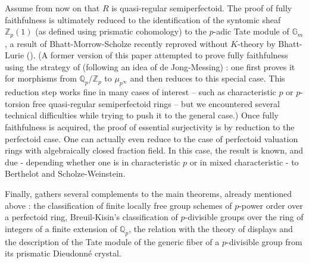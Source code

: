 \documentclass{amsart}
\theoremstyle{plain}
\theoremstyle{definition}
\newcommand{\F}{\mathbb{F}}
\newcommand{\Q}{\mathbb{Q}}
\newcommand{\Z}{\mathbb{Z}}
\newcommand{\purple}[1]{{\color{black} #1}}
\begin{document}
Assume from now on that $R$ is quasi-regular semiperfectoid. The proof of fully faithfulness is ultimately reduced to the identification of the syntomic sheaf $\Z_p(1)$ (as defined using prismatic cohomology) to the $p$-adic Tate module of $\mathbb{G}_m$, a result of Bhatt-Morrow-Scholze recently reproved without $K$-theory by Bhatt-Lurie (\cite[Theorem 7.5.6]{bhatt2022absolute}). (A former version of this paper attempted to prove fully faithfulness using the strategy of \cite{scholze_weinstein_moduli_of_p_divisible_groups} (following an idea of de Jong-Messing) : one first proves it for morphisms from $\mathbb{Q}_p/\mathbb{Z}_p$ to $\mu_{p^{\infty}}$ and then reduces to this special case. This reduction step works fine in many cases of interest -- such as characteristic $p$ or $p$-torsion free quasi-regular semiperfectoid rings -- but we encountered several technical difficulties while trying to push it to the general case.)
Once fully faithfulness is acquired, the proof of essential surjectivity is by reduction to the perfectoid case. One can actually even reduce to the case of perfectoid valuation rings with algebraically closed fraction field. In this case, the result is known, and due - depending whether one is in characteristic $p$ or in mixed characteristic - to Berthelot and Scholze-Weinstein.   

Finally,  gathers several complements to the main theorems, already mentioned above : the classification of finite locally free group schemes of $p$-power order over a perfectoid ring, Breuil-Kisin's classification of $p$-divisible groups over the ring of integers of a finite extension of $\Q_p$, the relation with the theory of displays and the description of the Tate module of the generic fiber of a $p$-divisible group from its prismatic Dieudonn\'e crystal.
\end{document}
